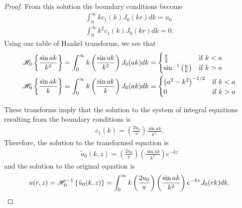 \begin{proof}
  From this solution the boundary conditions become
  \begin{align*}
    \int_0^\infty k c_1(k)  J_0(k r)dk = u_0\\
    \int_0^\infty k^2 c_1(k)  J_0(k r) dk = 0.
  \end{align*}
  Using our table of Hankel transforms, we see that
  \begin{align*}
    \mathscr{H}_{ {0} }\left\{ {\frac{\sin ak}{k^2}} \right\} &= \int_0^\infty k \left(\frac{\sin ak}{k^2}\right) J_0(ak)dk =
    \begin{cases}
      \frac{\pi}{2} & \text{if $k < a$} \\
      \sin^{-1}\left(\frac{a}{k}\right) & \text{if $k > a$} \\
    \end{cases}\\
    \mathscr{H}_{ {0} }\left\{ {\frac{\sin ak}{k}} \right\} &= \int_0^\infty k \left(\frac{\sin ak}{k}\right)J_0(ak) dk =
    \begin{cases}
      \left(a^2-k^2\right)^{-1/2} & \text{if $k < a$} \\
      0 & \text{if $k > a$} \\
    \end{cases}
  \end{align*}

  These transforms imply that the solution to the system of integral equations resulting from the boundary conditions is
  \begin{align*}
    c_1(k) = \left(\frac{2 u_0}{\pi}\right)\frac{\sin a k}{k^2}.
  \end{align*}
  Therefore, the solution to the transformed equation is
  \begin{align*}
    \tilde{u}_0(k, z) = \left(\frac{2 u_0}{\pi}\right)\left(\frac{\sin a k}{k^2}\right) e^{-kz}
  \end{align*}
  and the solution to the original equation is
  \begin{align*}
    u(r, z) = \mathscr{H}^{-1}_{ {0} }\left\{ {\tilde{u}_0(k, z)} \right\} = \int_0^\infty k\left(\frac{2 u_0}{\pi}\right)\left(\frac{\sin a k}{k^2} \right)e^{-kz} J_0(rk) dk.
  \end{align*}


\end{proof}
\newpage
